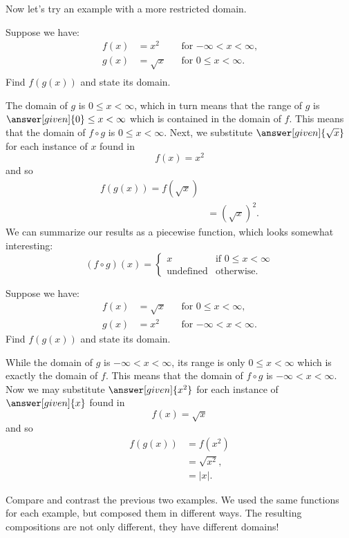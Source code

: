 \documentclass{ximera}
\begin{document}
Now let's try an example with a more restricted domain.

\begin{example}
 Suppose we have:
\begin{align*}
  f(x)&=x^2 &&\text{for $-\infty< x< \infty$,}\\
  g(x)&= \sqrt{x} &&\text{for $0\le x< \infty$.}\\
\end{align*}
Find $f(g(x))$ and state its domain.
\begin{explanation}
  The domain of $g$ is $0\le x< \infty$, which in turn means that the
  range of $g$ is $\answer[given]{0}\le x< \infty$ which is contained
  in the domain of $f$. This means that the domain of $f\circ g$ is
  $0\le x< \infty$.  Next, we substitute $\answer[given]{\sqrt{x}}$ for each
  instance of $x$ found in
  \[
  f(x)={{x}^{2}}
  \]
  and so
  \begin{align*}
  f(g(x))=f(\sqrt{x})\\
  &=\left(\sqrt{x}\right)^2.
  \end{align*}
  We can summarize our results as a piecewise function, which
  looks somewhat interesting:
  \[
  (f\circ g)(x) = 
  \begin{cases}
    x & \text{if $0\le x < \infty$}\\
   \text{undefined} &\text{otherwise}. 
  \end{cases}
  \]
\end{explanation}
\end{example}


\begin{example}
 Suppose we have:
\begin{align*}
  f(x)&=\sqrt{x} &&\text{for $0\le x< \infty$,}\\
  g(x)&= x^2 &&\text{for $-\infty< x< \infty$.}
\end{align*}
Find $f(g(x))$ and state its domain.
\begin{explanation}
  While the domain of $g$ is $-\infty< x< \infty$, its range is only
  $0 \le x<\infty$ which is exactly the domain of $f$. This means that
  the domain of $f\circ g$ is $-\infty< x< \infty$.  Now we may
  substitute $\answer[given]{x^2}$ for each instance of $\answer[given]{x}$ found in
  \[
  f(x)=\sqrt{x}
  \]
  and so
  \begin{align*}
  f(g(x))&=f(x^2)\\
  &=\sqrt{x^2},\\
  &=|x|.
  \end{align*}
\end{explanation}
\end{example}

Compare and contrast the previous two examples.  We used the same
functions for each example, but composed them in different ways.  The resulting
compositions are not only different, they have different domains!
\end{document}
